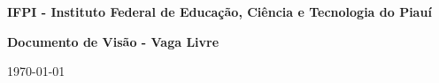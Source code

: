\documentclass[a4paper,12pt]{article}
\begin{document}

\begin{titlepage}
\thispagestyle{empty}
\begin{center}
\large{\bf{IFPI - Instituto Federal de Educação, Ciência e Tecnologia do Piauí}} \\
\end{center}
\vfill

\centering
\textbf{{\LARGE Documento de Visão - Vaga Livre}}  \\ \vspace{0.5cm}
\vfill


\begin{center}
\large{\today}
\end{center}
\end{titlepage}




\end{document}
